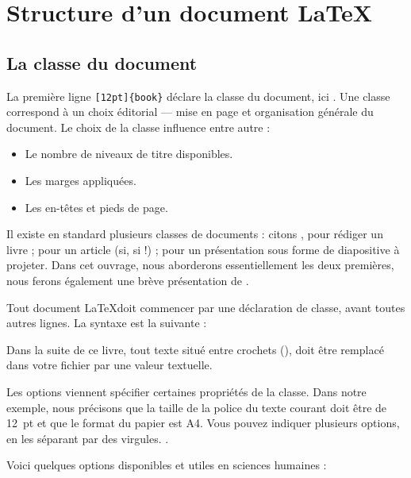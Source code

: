 \section{Structure d'un document \LaTeX}

\subsection{La classe du document}
La première ligne \verb|[12pt]{book}| déclare la classe du document, ici . Une classe correspond à un choix éditorial    --- mise en page et organisation générale du document. Le choix de la classe influence entre autre :
\begin{itemize}
\item Le nombre de niveaux de titre disponibles.
\item Les marges appliquées.
\item Les en-têtes et pieds de page.
\end{itemize}

Il existe en standard plusieurs classes de documents : citons , pour rédiger un livre ;  pour un article (si, si !) ;  pour un présentation sous forme de diapositive à projeter. Dans cet ouvrage, nous aborderons essentiellement les deux premières, nous ferons également une brève présentation de .



Tout document \LaTeX doit commencer par une déclaration de classe, avant toutes autres lignes. La syntaxe est la suivante : 

\begin{attention}
Dans la suite de ce livre, tout texte situé entre crochets (), doit être remplacé dans votre fichier  par une valeur textuelle.
\end{attention}

Les options viennent spécifier certaines propriétés de la classe. Dans notre exemple, nous précisons que la taille de la police du texte courant doit être de 12~pt et que le format du papier est A4. Vous pouvez indiquer plusieurs options, en les séparant par des virgules. \label{optionsclasse}. 

Voici quelques options disponibles et utiles en sciences humaines :

